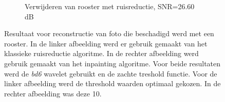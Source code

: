 \begin{figure}
\begin{subfigure}[b]{0.4\textwidth}
        \caption{Verwijderen van rooster met ruisreductie, SNR=26.60 dB}
        \label{fig:roster_inpainting}
    \end{subfigure}
    \caption{Resultaat voor reconstructie van foto die beschadigd werd met een rooster. In de linker afbeelding werd er gebruik gemaakt van het klassieke  ruisreductie algoritme. In de rechter afbeelding werd gebruik gemaakt van het inpainting algoritme. Voor beide resultaten werd de \textit{bd6} wavelet gebruikt en de zachte treshold functie. Voor de linker afbeelding werd de threshold waarden optimaal gekozen. In de rechter afbeelding was deze 10.}\label{fig:rooster}
\end{figure}














